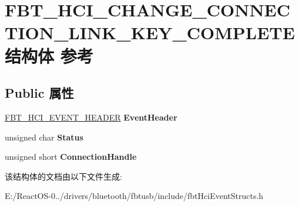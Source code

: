 \hypertarget{struct_f_b_t___h_c_i___c_h_a_n_g_e___c_o_n_n_e_c_t_i_o_n___l_i_n_k___k_e_y___c_o_m_p_l_e_t_e}{}\section{F\+B\+T\+\_\+\+H\+C\+I\+\_\+\+C\+H\+A\+N\+G\+E\+\_\+\+C\+O\+N\+N\+E\+C\+T\+I\+O\+N\+\_\+\+L\+I\+N\+K\+\_\+\+K\+E\+Y\+\_\+\+C\+O\+M\+P\+L\+E\+T\+E结构体 参考}
\label{struct_f_b_t___h_c_i___c_h_a_n_g_e___c_o_n_n_e_c_t_i_o_n___l_i_n_k___k_e_y___c_o_m_p_l_e_t_e}
\subsection*{Public 属性}
\begin{DoxyCompactItemize}
\item 
\mbox{\label{struct_f_b_t___h_c_i___c_h_a_n_g_e___c_o_n_n_e_c_t_i_o_n___l_i_n_k___k_e_y___c_o_m_p_l_e_t_e_ab590ac93dc96d2c810398982328be053}} 
\hyperlink{struct_f_b_t___h_c_i___e_v_e_n_t___h_e_a_d_e_r}{F\+B\+T\+\_\+\+H\+C\+I\+\_\+\+E\+V\+E\+N\+T\+\_\+\+H\+E\+A\+D\+ER} {\bfseries Event\+Header}
\item 
\mbox{\label{struct_f_b_t___h_c_i___c_h_a_n_g_e___c_o_n_n_e_c_t_i_o_n___l_i_n_k___k_e_y___c_o_m_p_l_e_t_e_a0f633f62d6573c706791423a62ac8442}} 
unsigned char {\bfseries Status}
\item 
\mbox{\label{struct_f_b_t___h_c_i___c_h_a_n_g_e___c_o_n_n_e_c_t_i_o_n___l_i_n_k___k_e_y___c_o_m_p_l_e_t_e_a75507a31d90c4196b6dd62d85b9283fa}} 
unsigned short {\bfseries Connection\+Handle}
\end{DoxyCompactItemize}


该结构体的文档由以下文件生成\+:\begin{DoxyCompactItemize}
\item 
E\+:/\+React\+O\+S-\/0../drivers/bluetooth/fbtusb/include/fbt\+Hci\+Event\+Structs.\+h\end{DoxyCompactItemize}
